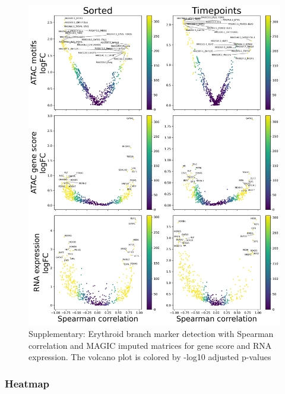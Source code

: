 \documentclass[a4paper]{article}
\begin{document}
\begin{figure}[!htb]
  \centering
  \includegraphics[width=\textwidth]{../figures/hematopoiesis/Erythroid_40_103_smooth_magic_single_branch_volcanos_motifs.png}
  \caption{Supplementary: Erythroid branch marker detection with Spearman correlation and MAGIC imputed matrices for gene score and RNA expression. The volcano plot is colored by -log10 adjusted p-values}
\end{figure}

\FloatBarrier
\subsubsection{Heatmap}
\end{document}
